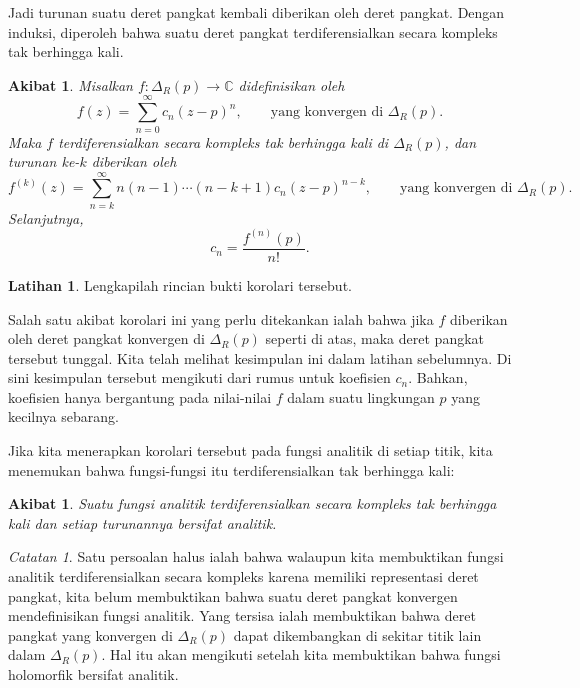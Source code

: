 \documentclass[12pt,openany]{book}
\newcommand{\C}{{\mathbb{C}}}
\theoremstyle{plain}
\newtheorem{cor}[thm]{Akibat}
\theoremstyle{remark}
\newtheorem{remark}[thm]{Catatan}
\theoremstyle{definition}
\newenvironment{exbox}{%
    \def\FrameCommand{\vrule width 1pt \relax\hspace{10pt}}%
    \MakeFramed{\advance\hsize-\width\FrameRestore}%
}{%
    \endMakeFramed
}
\theoremstyle{exercise}
\newtheorem{exercise}{Latihan}[section]
\theoremstyle{example}
\begin{document}
Jadi turunan suatu deret pangkat kembali diberikan oleh deret pangkat.
Dengan induksi, diperoleh bahwa suatu deret pangkat terdiferensialkan secara kompleks
tak berhingga kali.

\begin{cor} \label{cor:convpowserinfdif}
\pagebreak[2]
Misalkan $f \colon \Delta_R(p) \to \C$ didefinisikan oleh
\begin{equation*}
f(z) = \sum_{n=0}^\infty c_n {(z-p)}^n ,
\qquad \text{yang konvergen di } \Delta_R(p) .
\end{equation*}
Maka $f$ terdiferensialkan secara kompleks tak berhingga kali di $\Delta_R(p)$,
dan turunan ke-$k$ diberikan oleh
\begin{equation*}
f^{(k)}(z) = \sum_{n=k}^\infty n(n-1)\cdots(n-k+1) c_n {(z-p)}^{n-k} ,
\qquad \text{yang konvergen di } \Delta_R(p) .
\end{equation*}
Selanjutnya,
\begin{equation*}
c_n =
\frac{f^{(n)}(p)}{n!} .
\end{equation*}
\end{cor}

\begin{exbox}
\begin{exercise}
Lengkapilah rincian bukti korolari tersebut.
\end{exercise}
\end{exbox}

Salah satu akibat korolari ini yang perlu
ditekankan ialah bahwa jika $f$ diberikan oleh deret pangkat konvergen di
$\Delta_R(p)$ seperti di atas, maka deret pangkat tersebut tunggal.
Kita telah melihat kesimpulan ini dalam latihan sebelumnya.
Di sini kesimpulan tersebut
mengikuti dari rumus untuk koefisien $c_n$.  Bahkan,
koefisien hanya bergantung pada nilai-nilai $f$ dalam suatu lingkungan
$p$ yang kecilnya sebarang.

Jika kita menerapkan korolari tersebut pada fungsi analitik di setiap titik,
kita menemukan bahwa fungsi-fungsi itu terdiferensialkan tak berhingga kali:

\begin{cor} \label{cor:analinfdif}
Suatu fungsi analitik terdiferensialkan secara kompleks tak berhingga kali dan setiap
turunannya bersifat analitik.
\end{cor}

\begin{remark}
Satu persoalan halus ialah bahwa walaupun kita membuktikan fungsi analitik
terdiferensialkan secara kompleks karena memiliki representasi deret pangkat,
kita belum membuktikan bahwa suatu deret pangkat konvergen mendefinisikan fungsi
analitik.  Yang tersisa ialah membuktikan bahwa deret pangkat yang konvergen
di $\Delta_R(p)$ dapat
dikembangkan di sekitar titik lain dalam $\Delta_R(p)$.  Hal itu akan mengikuti
setelah kita membuktikan bahwa fungsi holomorfik bersifat analitik.
\end{remark}
\end{document}
